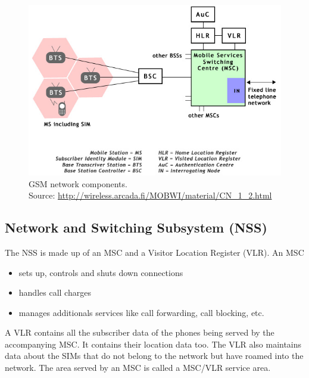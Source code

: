 \begin{figure}
\centering
\includegraphics[scale=0.5]{gsmNetworkComponents}
\caption[GSM network components]{GSM network components.\\
\footnotesize{Source: \url{http://wireless.arcada.fi/MOBWI/material/CN\_1\_2.html}}}
\end{figure}




\subsection{Network and Switching Subsystem (NSS)}

The NSS is made up of an MSC and a Visitor Location Register (VLR). An MSC 
\begin{itemize}[noitemsep,topsep=0pt,parsep=0pt,partopsep=0pt]
\item sets up, controls and shuts down connections
\item handles call charges
\item manages additionals services like call forwarding, call blocking, etc.
\end{itemize}

A VLR contains all the subscriber data of the phones being served by the accompanying MSC. It contains their location data too. The VLR also maintains data about the SIMs that do not belong to the network but have roamed into the network. The area served by an MSC is called a MSC/VLR service area.


